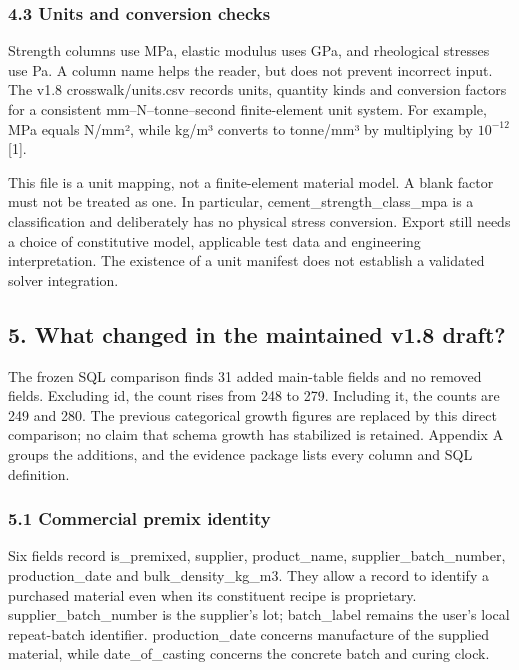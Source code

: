 \documentclass[
  american,
  11pt,
  letterpaper,
]{article}
\renewcommand{\texttt}[1]{{\ttfamily\fontsize{9.5}{11}\selectfont\hyphenchar\font=-1 #1}}
\begin{document}
\subsubsection{4.3 Units and conversion
checks}\label{units-and-conversion-checks}

Strength columns use MPa, elastic modulus uses GPa, and rheological
stresses use Pa. A column name helps the reader, but does not prevent
incorrect input. The v1.8 \texttt{crosswalk/units.csv} records units,
quantity kinds and conversion factors for a consistent
mm--N--tonne--second finite-element unit system. For example, MPa equals
N/mm², while kg/m³ converts to tonne/mm³ by multiplying by \(10^{-12}\)
{[}1{]}.

This file is a unit mapping, not a finite-element material model. A
blank factor must not be treated as one. In particular,
\texttt{cement\_strength\_class\_mpa} is a classification and
deliberately has no physical stress conversion. Export still needs a
choice of constitutive model, applicable test data and engineering
interpretation. The existence of a unit manifest does not establish a
validated solver integration.

\subsection{5. What changed in the maintained v1.8
draft?}\label{what-changed-in-the-maintained-v1.8-draft}

The frozen SQL comparison finds 31 added main-table fields and no
removed fields. Excluding \texttt{id}, the count rises from 248 to 279.
Including it, the counts are 249 and 280. The previous categorical
growth figures are replaced by this direct comparison; no claim that
schema growth has stabilized is retained. Appendix A groups the
additions, and the evidence package lists every column and SQL
definition.

\subsubsection{5.1 Commercial premix
identity}\label{commercial-premix-identity}

Six fields record \texttt{is\_premixed}, \texttt{supplier},
\texttt{product\_name}, \texttt{supplier\_batch\_number},
\texttt{production\_date} and \texttt{bulk\_density\_kg\_m3}. They allow
a record to identify a purchased material even when its constituent
recipe is proprietary. \texttt{supplier\_batch\_number} is the
supplier's lot; \texttt{batch\_label} remains the user's local
repeat-batch identifier. \texttt{production\_date} concerns manufacture
of the supplied material, while \texttt{date\_of\_casting} concerns the
concrete batch and curing clock.
\end{document}
